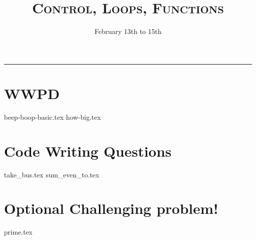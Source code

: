 \documentclass{exam}
\title{\textsc{Control, Loops, Functions}}
\date{February 13th to 15th}
\begin{document}
\maketitle
\rule{\textwidth}{0.15em}
\fontsize{12}{15}\selectfont


\section{WWPD}
\begin{questions}
{beep-boop-basic.tex}
\newpage
{how-big.tex}
\end{questions}

\newpage
\section{Code Writing Questions}
\begin{questions}
{take_bus.tex}
{sum_even_to.tex}
\newpage
\section{Optional Challenging problem!}
{prime.tex}

\end{questions}
\end{document}
